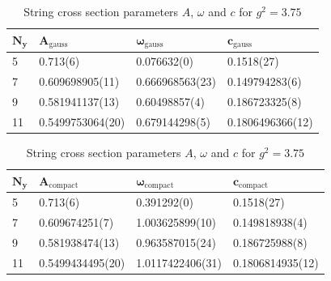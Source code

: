 \begin{table}[!hb]
\centering
\begin{tabular}{llll}
    $\mathbf{N_y}$ & $\mathbf{A_\mathrm{gauss}}$ & $\mathbf{\omega_\mathrm{gauss}}$ & $\mathbf{c_\mathrm{gauss}}$ \\ \hline
   5 & 0.713(6) & 0.076632(0) & 0.1518(27) \\
   7 & 0.609698905(11) & 0.666968563(23) & 0.149794283(6) \\
   9 & 0.581941137(13) & 0.60498857(4) & 0.186723325(8) \\
   11 & 0.5499753064(20) & 0.679144298(5) & 0.1806496366(12) \\
\end{tabular}
\begin{tabular}{llll}
    $\mathbf{N_y}$ & $\mathbf{A_\mathrm{compact}}$ & $\mathbf{\omega_\mathrm{compact}}$ & $\mathbf{c_\mathrm{compact}}$ \\ \hline
   5 & 0.713(6) & 0.391292(0) & 0.1518(27) \\
   7 & 0.609674251(7) & 1.003625899(10) & 0.149818938(4) \\
   9 & 0.581938474(13) & 0.963587015(24) & 0.186725988(8) \\
   11 & 0.5499434495(20) & 1.0117422406(31) & 0.1806814935(12) \\
\end{tabular}
\caption{String cross section parameters $A$, $\omega$ and $c$ for $g^2=3.75$}
\end{table}
